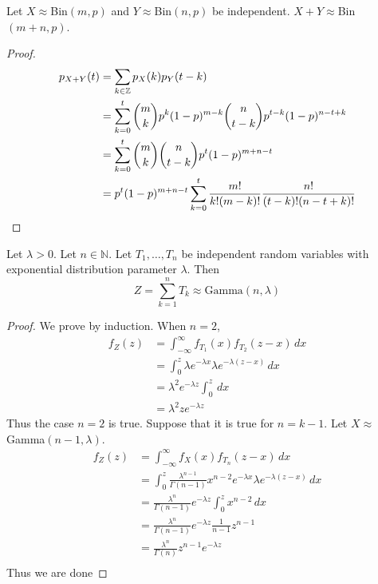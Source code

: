 \documentclass[a4paper]{article}
\begin{document}
\begin{prp}{}{} Let $X\approx$Bin$(m,p)$ and $Y\approx$Bin$(n,p)$ be independent. $X+Y\approx$Bin$(m+n,p)$. 
\end{prp}
\begin{proof}
\begin{align*}
p_{X+Y}(t)&=\sum_{k\in\mathbb{Z}}p_X(k)p_Y(t-k)\\
&=\sum_{k=0}^t\binom{m}{k}p^k(1-p)^{m-k}\binom{n}{t-k}p^{t-k}(1-p)^{n-t+k}\\
&=\sum_{k=0}^t\binom{m}{k}\binom{n}{t-k}p^t(1-p)^{m+n-t}\\
&=p^t(1-p)^{m+n-t}\sum_{k=0}^t\frac{m!}{k!(m-k)!}\frac{n!}{(t-k)!(n-t+k)!}\\
\end{align*}
\end{proof}

\begin{prp}{}{} Let $\lambda>0$. Let $n\in\mathbb{N}$. Let $T_1,\dots,T_n$ be independent random variables with exponential distribution parameter $\lambda$. Then $$Z=\sum_{k=1}^nT_k\approx\text{Gamma}(n,\lambda)$$
\end{prp}
\begin{proof} We prove by induction. When $n=2$, 
\begin{align*}
f_Z(z)&=\int_{-\infty}^\infty f_{T_1}(x)f_{T_2}(z-x)\,dx\\
&=\int_0^z\lambda e^{-\lambda x}\lambda e^{-\lambda(z-x)}\,dx\\
&=\lambda^2e^{-\lambda z}\int_0^z\,dx\\
&=\lambda^2ze^{-\lambda z}
\end{align*} Thus the case $n=2$ is true. Suppose that it is true for $n=k-1$. Let $X\approx$Gamma$(n-1,\lambda)$. 
\begin{align*}
f_Z(z)&=\int_{-\infty}^\infty f_X(x)f_{T_n}(z-x)\,dx\\
&=\int_0^z\frac{\lambda^{n-1}}{\Gamma(n-1)}x^{n-2}e^{-\lambda x}\lambda e^{-\lambda(z-x)}\,dx\\
&=\frac{\lambda^{n}}{\Gamma(n-1)}e^{-\lambda z}\int_0^zx^{n-2}\,dx\\
&=\frac{\lambda^{n}}{\Gamma(n-1)}e^{-\lambda z}\frac{1}{n-1}z^{n-1}\\
&=\frac{\lambda^{n}}{\Gamma(n)}z^{n-1}e^{-\lambda z}\\
\end{align*} Thus we are done
\end{proof}
\end{document}
